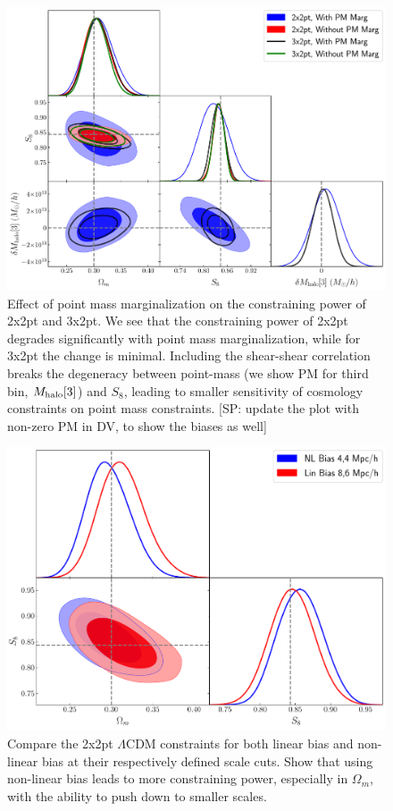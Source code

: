 \documentclass[fleqn,usenatbib]{mnras}
\newcommand{\SP}[1]{{\color{brown}[SP: #1]}}
\begin{document}
\begin{figure}
\includegraphics[width=\columnwidth]{figs/PM_constraints_2x2pt_3x2pt.pdf}
\caption[]{Effect of point mass marginalization on the constraining power of 2x2pt and 3x2pt. We see that the constraining power of 2x2pt degrades significantly with point mass marginalization, while for 3x2pt the change is minimal. Including the shear-shear correlation  breaks the degeneracy between point-mass (we show PM for third bin, $M_{\rm halo}[3]$) and $S_8$, leading to smaller sensitivity of cosmology constraints on point mass constraints. \SP{update the plot with non-zero PM in DV, to show the biases as well} }
\label{fig:pm_effect}
\end{figure}

\begin{figure}
\includegraphics[width=\columnwidth]{figs/compare_cosmo_nl44_lin86.pdf}
\caption[]{Compare the 2x2pt $\Lambda$CDM constraints for both linear bias and non-linear bias at their respectively defined scale cuts. Show that using non-linear bias leads to more constraining power, especially in $\Omega_m$, with the ability to push down to smaller scales. }
\label{fig:des_comp}
\end{figure}
\end{document}
